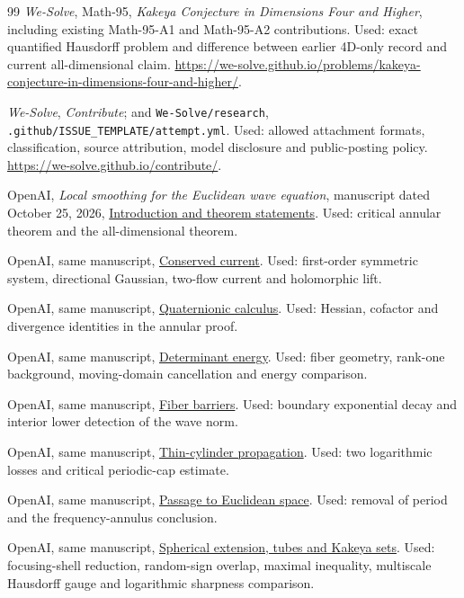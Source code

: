 \documentclass[11pt,a4paper]{article}
\numberwithin{equation}{section}
\theoremstyle{definition}
\theoremstyle{remark}
\newcommand{\pinlink}[2]{\href{https://github.com/openai/math/blob/7ef5c0cc5ca4b0e072b7a050fca09ab24bc6fa3a/#1}{#2}}
\newcommand{\srcsection}[2]{\pinlink{preprints/Local-smoothing-for-the-Euclidean-wave-equation-October-25-2026/build/sections/#1.tex}{#2}}
\begin{document}
\begin{thebibliography}{99}
 \emph{We-Solve}, Math-95, \emph{Kakeya
Conjecture in Dimensions Four and Higher}, including existing
Math-95-A1 and Math-95-A2 contributions. Used: exact quantified
Hausdorff problem and difference between earlier 4D-only record
and current all-dimensional claim.
\url{https://we-solve.github.io/problems/kakeya-conjecture-in-dimensions-four-and-higher/}.

 \emph{We-Solve}, \emph{Contribute}; and
\texttt{We-Solve/research}, \texttt{.github/ISSUE\_TEMPLATE/attempt.yml}.
Used: allowed attachment formats, classification, source attribution,
model disclosure and public-posting policy.
\url{https://we-solve.github.io/contribute/}.

 OpenAI, \emph{Local smoothing for the
Euclidean wave equation}, manuscript dated October 25, 2026,
\srcsection{introduction}{Introduction and theorem statements}.
Used: critical annular theorem and the all-dimensional theorem.

 OpenAI, same manuscript,
\srcsection{current}{Conserved current}. Used: first-order symmetric
system, directional Gaussian, two-flow current and holomorphic lift.

 OpenAI, same manuscript,
\srcsection{calculus}{Quaternionic calculus}. Used: Hessian,
cofactor and divergence identities in the annular proof.

 OpenAI, same manuscript,
\srcsection{energy}{Determinant energy}. Used: fiber geometry,
rank-one background, moving-domain cancellation and energy comparison.

 OpenAI, same manuscript,
\srcsection{barrier}{Fiber barriers}. Used: boundary exponential
decay and interior lower detection of the wave norm.

 OpenAI, same manuscript,
\srcsection{propagation}{Thin-cylinder propagation}. Used: two
logarithmic losses and critical periodic-cap estimate.

 OpenAI, same manuscript,
\srcsection{transfer}{Passage to Euclidean space}. Used: removal of
period and the frequency-annulus conclusion.

 OpenAI, same manuscript,
\srcsection{kakeya}{Spherical extension, tubes and Kakeya sets}.
Used: focusing-shell reduction, random-sign overlap, maximal inequality,
multiscale Hausdorff gauge and logarithmic sharpness comparison.


\end{thebibliography}
\end{document}
